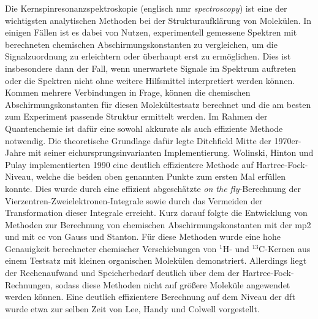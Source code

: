 Die Kernspinresonanzspektroskopie (englisch \ac{nmr} \textit{spectroscopy}) ist eine der wichtigsten analytischen Methoden bei der Strukturaufklärung von Molekülen. In einigen Fällen ist es dabei von Nutzen, experimentell gemessene Spektren mit berechneten chemischen Abschirmungskonstanten zu vergleichen, um die Signalzuordnung zu erleichtern oder überhaupt erst zu ermöglichen. Dies ist insbesondere dann der Fall, wenn unerwartete Signale im Spektrum auftreten oder die Spektren nicht ohne weitere Hilfsmittel interpretiert werden können. Kommen mehrere Verbindungen in Frage, können die chemischen Abschirmungskonstanten für diesen Molekültestsatz berechnet und die am besten zum Experiment passende Struktur ermittelt werden. Im Rahmen der Quantenchemie ist dafür eine sowohl akkurate als auch effiziente Methode notwendig. Die theoretische Grundlage dafür legte Ditchfield\supercite{ditchfield1974self} Mitte der 1970er-Jahre mit seiner eichursprungsinvarianten Implementierung. Wolinski, Hinton und Pulay\supercite{wolinski1990efficient} implementierten 1990 eine deutlich effizientere Methode auf Hartree-Fock-Niveau, welche die beiden oben genannten Punkte zum ersten Mal erfüllen konnte. Dies wurde durch eine effizient abgeschätzte \glqq \textit{on the fly}\grqq{}-Berechnung der Vierzentren-Zweielektronen-Integrale sowie durch das Vermeiden der Transformation dieser Integrale erreicht. Kurz darauf folgte die Entwicklung von Methoden zur Berechnung von chemischen Abschirmungskonstanten mit der \ac{mp2}\supercite{gauss1992calculation} und mit \ac{cc}\supercite{gauss1995gauge} von Gauss und Stanton. Für diese Methoden wurde eine hohe Genauigkeit berechneter chemischer Verschiebungen von $^1$H- und $^{13}$C-Kernen aus einem Testsatz mit kleinen organischen Molekülen demonstriert. Allerdings liegt der Rechenaufwand und Speicherbedarf deutlich über dem der Hartree-Fock-Rechnungen, sodass diese Methoden nicht auf größere Moleküle angewendet werden können. Eine deutlich effizientere Berechnung auf dem Niveau der \ac{dft} wurde etwa zur selben Zeit von Lee, Handy und Colwell\supercite{lee1995density} vorgestellt. 

